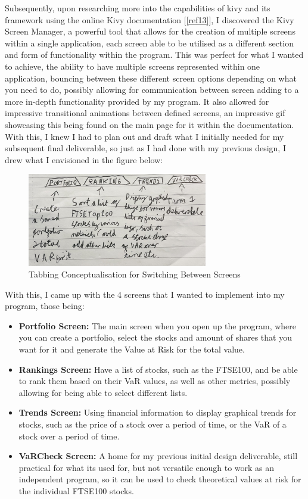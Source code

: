 \documentclass{article}
\begin{document}
Subsequently, upon researching more into the capabilities of kivy and its framework using the online Kivy documentation [\ref{ref13}], I discovered the Kivy Screen Manager, a powerful tool that allows for the creation of multiple screens within a single application, each screen able to be utilised as a different section and form of functionality within the program. This was perfect for what I wanted to achieve, the ability to have multiple screens represented within one application, bouncing between these different screen options depending on what you need to do, possibly allowing for communication between screen adding to a more in-depth functionality provided by my program. It also allowed for impressive transitional animations between defined screens, an impressive gif showcasing this being found on the main page for it within the documentation. With this, I knew I had to plan out and draft what I initially needed for my subsequent final deliverable, so just as I had done with my previous design, I drew what I envisioned in the figure below:\\\vspace{0.3cm}

\begin{figure}[h]
  \centering
  \includegraphics[width=0.7\textwidth]{Images/Term 2 Images/IMG_1346.jpg}
  \caption{Tabbing Conceptualisation for Switching Between Screens}
  \label{fig:Tabbing Concept}
\end{figure}

With this, I came up with the 4 screens that I wanted to implement into my program, those being:
\begin{itemize}
  \item \textbf{Portfolio Screen:} The main screen when you open up the program, where you can create a portfolio, select the stocks and amount of shares that you want for it and generate the Value at Risk for the total value.
  \item \textbf{Rankings Screen:} Have a list of stocks, such as the FTSE100, and be able to rank them based on their VaR values, as well as other metrics, possibly allowing for being able to select different lists.
  \item \textbf{Trends Screen:} Using financial information to display graphical trends for stocks, such as the price of a stock over a period of time, or the VaR of a stock over a period of time.
  \item \textbf{VaRCheck Screen:} A home for my previous initial design deliverable, still practical for what its used for, but not versatile enough to work as an independent program, so it can be used to check theoretical values at risk for the individual FTSE100 stocks.
\end{itemize}
\end{document}
